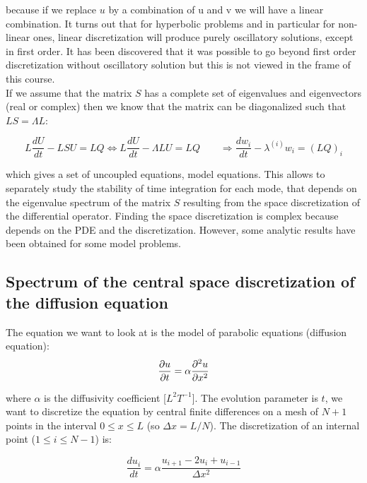 because if we replace $u$ by a combination of u and v we will have a linear combination. It turns out that for hyperbolic problems and in particular for non-linear ones, linear discretization will produce purely oscillatory solutions, except in first order. It has been discovered that it was possible to go beyond first order discretization without oscillatory solution but this is not viewed in the frame of this course. \\

If we assume that the matrix $S$ has a complete set of eigenvalues and eigenvectors (real or complex) then we know that the matrix can be diagonalized such that $LS = \Lambda L$:

\begin{equation}
L\frac{dU}{dt} - LSU = LQ \Leftrightarrow L\frac{dU}{dt} - \Lambda LU = LQ \qquad \Rightarrow \frac{dw_i}{dt} - \lambda ^{(i)}w_i = (LQ )_i 
\end{equation}

which gives a set of uncoupled equations, model equations. This allows to separately study the stability of time integration for each mode, that depends on the eigenvalue spectrum of the matrix $S$ resulting from the space discretization of the differential operator. Finding the space discretization is complex because depends on the PDE and the discretization. However, some analytic results have been obtained for some model problems.

\subsection{Spectrum of the central space discretization of the diffusion equation}
The equation we want to look at is the model of parabolic equations (diffusion equation):
\begin{equation}
\frac{\partial u}{\partial t} = \alpha \frac{\partial ^2 u}{\partial x^2}
\end{equation}

where $\alpha $ is the diffusivity coefficient [$L^2T^{-1}$]. The evolution parameter is $t$, we want to discretize the equation by central finite differences on a mesh of $N+1$ points in the interval $0 \leq x \leq L$ (so $\Delta x = L/N$). The discretization of an internal point ($1\leq i \leq N-1$) is: 

\begin{equation}
\frac{d u _i}{d t} = \alpha \frac{u_{i+1}-2u_i + u_{i-1}}{\Delta x^2}
\label{3.12}
\end{equation}

